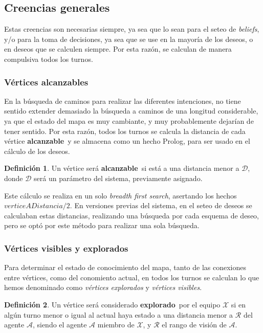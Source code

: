 \documentclass[oneside]{book}
\theoremstyle{definition}
\newtheorem{definicion}{Definición}[section]
\theoremstyle{example}
\newcommand{\lit}[1]{\mbox{$ #1$}}
\begin{document}
\subsection{Creencias generales}

\label{sec:creenciasGenerales}

Estas creencias son necesarias siempre, ya sea que lo sean para el seteo de 
\textit{beliefs}, y/o para la toma de decisiones, ya sea que se use en la mayoría
de los deseos, o en deseos que se calculen siempre. Por esta razón, se calculan
de manera compulsiva todos los turnos.


\subsubsection{Vértices alcanzables}

En la búsqueda de caminos para realizar las diferentes intenciones, no tiene sentido
extender demasiado la búsqueda a caminos de una longitud considerable, ya que el 
estado del mapa es muy cambiante, y muy probablemente dejarían de tener sentido. Por
esta razón, todos los turnos se calcula la distancia de cada vértice 
\textbf{alcanzable}\ y se almacena como un hecho Prolog, para ser usado en el 
cálculo de los deseos.

\begin{definicion}
Un vértice será \textbf{alcanzable}\ si está a una distancia menor a $\mathcal 
D$, donde $\mathcal D$ será un parámetro del sistema, previamente asignado.
\end{definicion}

Este cálculo se realiza en un solo \textit{breadth first search}, asertando los hechos
\lit{verticeADistancia/2}. En versiones previas del sistema, en el seteo de deseos
se calculaban estas distancias, realizando una búsqueda por cada esquema de deseo, 
pero se optó por este método para realizar una sola búsqueda.


\subsubsection{Vértices visibles y explorados}

Para determinar el estado de conocimiento del mapa, tanto de las conexiones
entre vértices, como del conomiento actual, en todos los turnos se calculan
lo que hemos denominado como \textit{vértices explorados} y \textit{vértices 
visibles}. 

\begin{definicion}
Un vértice será considerado \textbf{explorado}\ por el equipo $\mathcal X$ si 
en algún turno menor o igual al actual haya estado a una distancia menor a 
$\mathcal R$ del agente $\mathcal A$, siendo el agente $\mathcal A$ miembro de 
$\mathcal X$, y $\mathcal R$ el rango de visión de $\mathcal A$.
\end{definicion}
\end{document}
